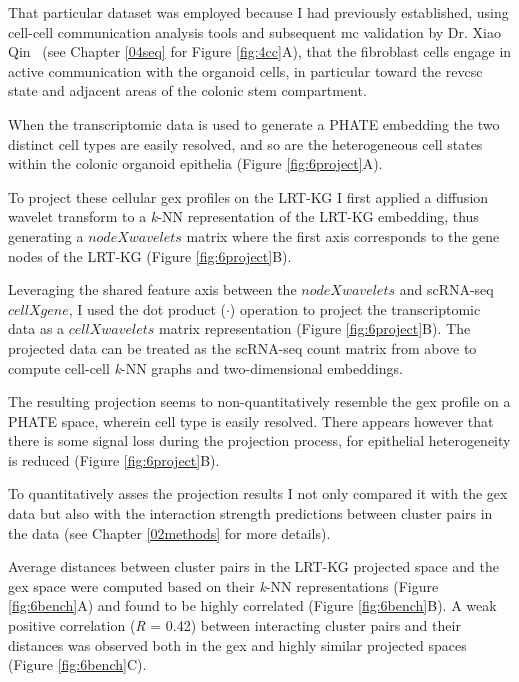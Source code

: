 That particular dataset was employed because I had previously established, using cell-cell communication analysis tools and subsequent \acrshort{mc} validation by Dr. Xiao Qin~\cite{cardoso_rodriguez_single-cell_2023} (see Chapter \ref{04seq} for Figure \ref{fig:4cc}A), that the fibroblast cells engage in active communication with the organoid cells, in particular toward the \acrshort{revcsc} state and adjacent areas of the colonic stem compartment. 

When the transcriptomic data is used to generate a PHATE embedding the two distinct cell types are easily resolved, and so are the heterogeneous cell states within the colonic organoid epithelia (Figure \ref{fig:6project}A).

To project these cellular \acrshort{gex} profiles on the LRT-KG I first applied a diffusion wavelet transform to a \emph{k}-NN representation of the LRT-KG embedding, thus generating a \(node X wavelets\) matrix where the first axis corresponds to the gene nodes of the LRT-KG (Figure \ref{fig:6project}B). 

Leveraging the shared feature axis between the \(node X wavelets\) and scRNA-seq \(cell X gene\), I used the dot product (\(\cdot\)) operation to project the transcriptomic data as a \(cell X wavelets\) matrix representation (Figure \ref{fig:6project}B). The projected data can be treated as the scRNA-seq count matrix from above to compute cell-cell \emph{k}-NN graphs and two-dimensional embeddings.

The resulting projection seems to non-quantitatively resemble the \acrshort{gex} profile on a PHATE space, wherein cell type is easily resolved. There appears however that there is some signal loss during the projection process, for epithelial heterogeneity is reduced (Figure \ref{fig:6project}B). 

To quantitatively asses the projection results I not only compared it with the \acrshort{gex} data but also with the interaction strength predictions between cluster pairs in the data (see Chapter \ref{02methods} for more details). 

Average distances between cluster pairs in the LRT-KG projected space and the \acrshort{gex} space were computed based on their \emph{k}-NN representations (Figure \ref{fig:6bench}A) and found to be highly correlated (Figure \ref{fig:6bench}B). A weak positive correlation (\emph{R} = 0.42) between interacting cluster pairs and their distances was observed both in the \acrshort{gex} and highly similar projected spaces (Figure \ref{fig:6bench}C).

